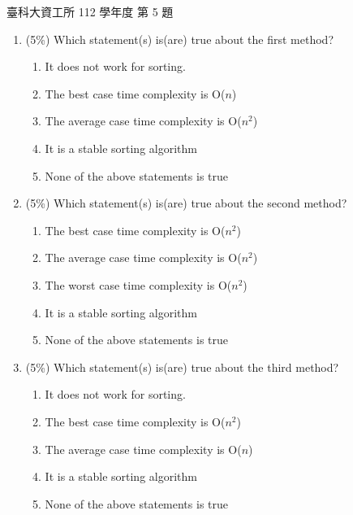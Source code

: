 \begin{pastexam}[label={px:ntust-112-ice-05}]{臺科大資工所 112 學年度 第 5 題}
\begin{enumerate}[label=(\arabic*)]
\item (5\%) Which statement(s) is(are) true about the first method?
\begin{enumerate}[label=(\Alph*)]
\item It does not work for sorting.
\item The best case time complexity is O($n$)
\item The average case time complexity is O($n^2$)
\item It is a stable sorting algorithm
\item None of the above statements is true
\end{enumerate}
\item (5\%) Which statement(s) is(are) true about the second method?
\begin{enumerate}[label=(\Alph*)]
\item The best case time complexity is O($n^2$)
\item The average case time complexity is O($n^2$)
\item The worst case time complexity is O($n^2$)
\item It is a stable sorting algorithm
\item None of the above statements is true
\end{enumerate}
\item (5\%) Which statement(s) is(are) true about the third method?
\begin{enumerate}[label=(\Alph*)]
\item It does not work for sorting.
\item The best case time complexity is O($n^2$)
\item The average case time complexity is O($n$)
\item It is a stable sorting algorithm
\item None of the above statements is true
\end{enumerate}
\end{enumerate}
\end{pastexam}

